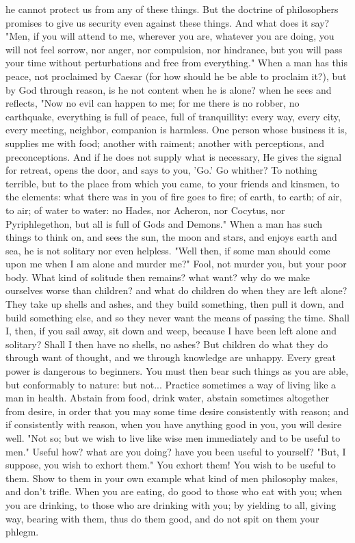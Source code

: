 \documentclass[a4paper]{article}
\begin{document}
he cannot protect us from any of these things. But the doctrine of philosophers
promises to give us security even against these things. And what does it say?
"Men, if you will attend to me, wherever you are, whatever you are doing, you
will not feel sorrow, nor anger, nor compulsion, nor hindrance, but you will
pass your time without perturbations and free from everything." When a man has
this peace, not proclaimed by Caesar (for how should he be able to proclaim
it?), but by God through reason, is he not content when he is alone? when he
sees and reflects, "Now no evil can happen to me; for me there is no robber, no
earthquake, everything is full of peace, full of tranquillity: every way, every
city, every meeting, neighbor, companion is harmless. One person whose business
it is, supplies me with food; another with raiment; another with perceptions,
and preconceptions. And if he does not supply what is necessary, He gives the
signal for retreat, opens the door, and says to you, 'Go.' Go whither? To
nothing terrible, but to the place from which you came, to your friends and
kinsmen, to the elements: what there was in you of fire goes to fire; of earth,
to earth; of air, to air; of water to water: no Hades, nor Acheron, nor
Cocytus, nor Pyriphlegethon, but all is full of Gods and Demons." When a man
has such things to think on, and sees the sun, the moon and stars, and enjoys
earth and sea, he is not solitary nor even helpless. "Well then, if some man
should come upon me when I am alone and murder me?" Fool, not murder you, but
your poor body.
    What kind of solitude then remains? what want? why do we make ourselves
worse than children? and what do children do when they are left alone? They
take up shells and ashes, and they build something, then pull it down, and
build something else, and so they never want the means of passing the time.
Shall I, then, if you sail away, sit down and weep, because I have been left
alone and solitary? Shall I then have no shells, no ashes? But children do what
they do through want of thought, and we through knowledge are unhappy.
    Every great power is dangerous to beginners. You must then bear such things
as you are able, but conformably to nature: but not... Practice sometimes a way
of living like a man in health. Abstain from food, drink water, abstain
sometimes altogether from desire, in order that you may some time desire
consistently with reason; and if consistently with reason, when you have
anything good in you, you will desire well. "Not so; but we wish to live like
wise men immediately and to be useful to men." Useful how? what are you doing?
have you been useful to yourself? "But, I suppose, you wish to exhort them."
You exhort them! You wish to be useful to them. Show to them in your own
example what kind of men philosophy makes, and don't trifle. When you are
eating, do good to those who eat with you; when you are drinking, to those who
are drinking with you; by yielding to all, giving way, bearing with them, thus
do them good, and do not spit on them your phlegm.
\end{document}
